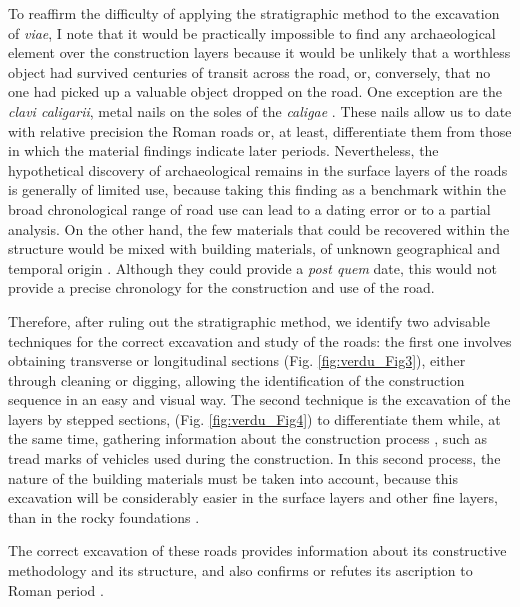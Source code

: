 	To reaffirm the difficulty of applying the stratigraphic method to the excavation of \textit{viae}, I note that it would be practically impossible to find any archaeological element over the construction layers because it would be unlikely that a worthless object had survived centuries of transit across the road, or, conversely, that no one had picked up a valuable object dropped on the road. One exception are the \textit{clavi caligarii}, metal nails on the soles of the \textit{caligae} \parencite{Rodriguez_2012}. These nails allow us to date with relative precision the Roman roads or, at least, differentiate them from those in which the material findings indicate later periods. Nevertheless, the hypothetical discovery of archaeological remains in the surface layers of the roads is generally of limited use, because taking this finding as a benchmark within the broad chronological range of road use can lead to a dating error or to a partial analysis. On the other hand, the few materials that could be recovered within the structure would be mixed with building materials, of unknown geographical and temporal origin \parencite[36]{Moreno_2009}. Although they could provide a \textit{post quem} date, this would not provide a precise chronology for the construction and use of the road.
	
	Therefore, after ruling out the stratigraphic method, we identify two advisable techniques for the correct excavation and study of the roads: the first one involves obtaining transverse or longitudinal sections (Fig. \ref{fig:verdu_Fig3}), either through cleaning or digging, allowing the identification of the construction sequence in an easy and visual way. The second technique is the excavation of the layers by stepped sections, (Fig. \ref{fig:verdu_Fig4}) to differentiate them while, at the same time, gathering information about the construction process \parencite[49]{Palomino_2010}, such as tread marks of vehicles used during the construction. In this second process, the nature of the building materials must be taken into account, because this excavation will be considerably easier in the surface layers and other fine layers, than in the rocky foundations \parencite[35]{Moreno_2009}.
	
	The correct excavation of these roads provides information about its constructive methodology and its structure, and also confirms or refutes its ascription to Roman period \parencites[33]{Moreno_2009}[72]{Palomino_2010}. 
	
